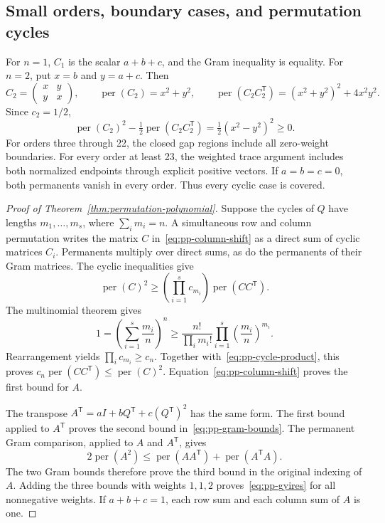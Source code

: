\documentclass[11pt,a4paper]{article}
\theoremstyle{definition}
\theoremstyle{remark}
\newcommand{\per}{\operatorname{per}}
\newcommand{\T}{\mathsf{T}}
\begin{document}
\subsection{Small orders, boundary cases, and permutation cycles}

For $n=1$, $C_1$ is the scalar $a+b+c$, and the Gram inequality is equality.
For $n=2$, put $x=b$ and $y=a+c$.
Then
\[
C_2=\begin{pmatrix}x&y\\y&x\end{pmatrix},\qquad
\per(C_2)=x^2+y^2,
\qquad
\per(C_2C_2^\T)=(x^2+y^2)^2+4x^2y^2.
\]
Since $c_2=1/2$,
\[
\per(C_2)^2-\tfrac12\per(C_2C_2^\T)
=\tfrac12(x^2-y^2)^2\ge0.
\]
For orders three through 22, the closed gap regions include all zero-weight boundaries.
For every order at least 23, the weighted trace argument includes both normalized endpoints through explicit positive vectors.
If $a=b=c=0$, both permanents vanish in every order.
Thus every cyclic case is covered.

\begin{proof}[Proof of Theorem~\ref{thm:permutation-polynomial}]
Suppose the cycles of $Q$ have lengths $m_1,\ldots,m_s$, where $\sum_i m_i=n$.
A simultaneous row and column permutation writes the matrix $C$ in~\eqref{eq:pp-column-shift} as a direct sum of cyclic matrices $C_i$.
Permanents multiply over direct sums, as do the permanents of their Gram matrices.
The cyclic inequalities give
\begin{equation}\label{eq:pp-cycle-product}
\per(C)^2
\ge\left(\prod_{i=1}^s c_{m_i}\right)\per(CC^\T).
\end{equation}
The multinomial theorem gives
\[
1=\left(\sum_{i=1}^s\frac{m_i}{n}\right)^n
\ge\frac{n!}{\prod_i m_i!}
\prod_{i=1}^s\left(\frac{m_i}{n}\right)^{m_i}.
\]
Rearrangement yields $\prod_i c_{m_i}\ge c_n$.
Together with~\eqref{eq:pp-cycle-product}, this proves
$c_n\per(CC^\T)\le\per(C)^2$.
Equation~\eqref{eq:pp-column-shift} proves the first bound for $A$.

The transpose $A^\T=aI+bQ^\T+c(Q^\T)^2$ has the same form.
The first bound applied to $A^\T$ proves the second bound in~\eqref{eq:pp-gram-bounds}.
The permanent Gram comparison, applied to $A$ and $A^\T$, gives
\[
2\per(A^2)\le\per(AA^\T)+\per(A^\T A).
\]
The two Gram bounds therefore prove the third bound in the original indexing of $A$.
Adding the three bounds with weights $1,1,2$ proves~\eqref{eq:pp-gyires} for all nonnegative weights.
If $a+b+c=1$, each row sum and each column sum of $A$ is one.
\end{proof}
\end{document}
